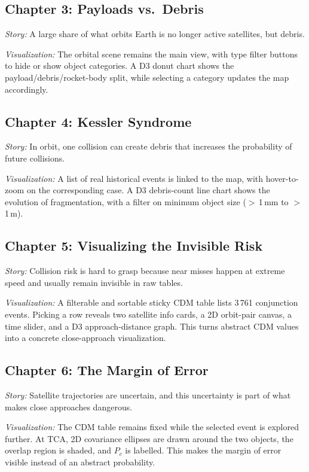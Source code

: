 \subsection{Chapter 3: Payloads vs.\ Debris}
\textit{Story:} A large share of what orbits Earth is no longer active satellites, but debris.

\textit{Visualization:} The orbital scene remains the main view, with type filter buttons to hide or show object categories. A D3 donut chart shows the payload/debris/rocket-body split, while selecting a category updates the map accordingly.

\subsection{Chapter 4: Kessler Syndrome}
\textit{Story:} In orbit, one collision can create debris that increases the probability of future collisions.

\textit{Visualization:} A list of real historical events is linked to the map, with hover-to-zoom on the corresponding case. A D3 debris-count line chart shows the evolution of fragmentation, with a filter on minimum object size ($>$\,1\,mm to $>$\,1\,m).

\subsection{Chapter 5: Visualizing the Invisible Risk}
\textit{Story:} Collision risk is hard to grasp because near misses happen at extreme speed and usually remain invisible in raw tables.

\textit{Visualization:} A filterable and sortable sticky CDM table lists 3\,761 conjunction events. Picking a row reveals two satellite info cards, a 2D orbit-pair canvas, a time slider, and a D3 approach-distance graph. This turns abstract CDM values into a concrete close-approach visualization.

\subsection{Chapter 6: The Margin of Error}
\textit{Story:} Satellite trajectories are uncertain, and this uncertainty is part of what makes close approaches dangerous.

\textit{Visualization:} The CDM table remains fixed while the selected event is explored further. At TCA, 2D covariance ellipses are drawn around the two objects, the overlap region is shaded, and $P_c$ is labelled. This makes the margin of error visible instead of an abstract probability.

